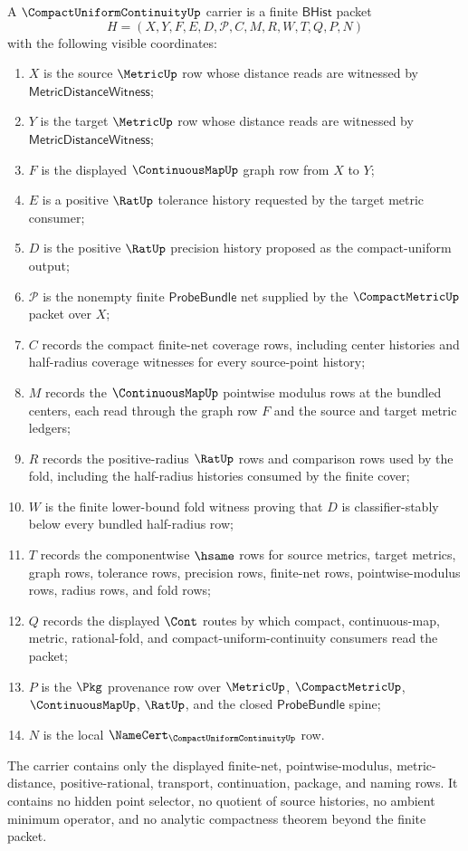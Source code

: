 \begin{definition}
\label{def:compact-uniform-continuity-carrier}
A $\CompactUniformContinuityUp$ carrier is a finite $\mathsf{BHist}$ packet
$$
H=(X,Y,F,E,D,\mathcal{P},C,M,R,W,T,Q,P,N)
$$
with the following visible coordinates:
\begin{enumerate}
\item $X$ is the source $\MetricUp$ row whose distance reads are witnessed by $\mathsf{MetricDistanceWitness}$;
\item $Y$ is the target $\MetricUp$ row whose distance reads are witnessed by $\mathsf{MetricDistanceWitness}$;
\item $F$ is the displayed $\ContinuousMapUp$ graph row from $X$ to $Y$;
\item $E$ is a positive $\RatUp$ tolerance history requested by the target metric consumer;
\item $D$ is the positive $\RatUp$ precision history proposed as the compact-uniform output;
\item $\mathcal{P}$ is the nonempty finite $\mathsf{ProbeBundle}$ net supplied by the $\CompactMetricUp$ packet over $X$;
\item $C$ records the compact finite-net coverage rows, including center histories and half-radius coverage witnesses for every source-point history;
\item $M$ records the $\ContinuousMapUp$ pointwise modulus rows at the bundled centers, each read through the graph row $F$ and the source and target metric ledgers;
\item $R$ records the positive-radius $\RatUp$ rows and comparison rows used by the fold, including the half-radius histories consumed by the finite cover;
\item $W$ is the finite lower-bound fold witness proving that $D$ is classifier-stably below every bundled half-radius row;
\item $T$ records the componentwise $\hsame$ rows for source metrics, target metrics, graph rows, tolerance rows, precision rows, finite-net rows, pointwise-modulus rows, radius rows, and fold rows;
\item $Q$ records the displayed $\Cont$ routes by which compact, continuous-map, metric, rational-fold, and compact-uniform-continuity consumers read the packet;
\item $P$ is the $\Pkg$ provenance row over $\MetricUp$, $\CompactMetricUp$, $\ContinuousMapUp$, $\RatUp$, and the closed $\mathsf{ProbeBundle}$ spine;
\item $N$ is the local $\NameCert_{\CompactUniformContinuityUp}$ row.
\end{enumerate}
The carrier contains only the displayed finite-net, pointwise-modulus, metric-distance, positive-rational, transport, continuation, package, and naming rows. It contains no hidden point selector, no quotient of source histories, no ambient minimum operator, and no analytic compactness theorem beyond the finite packet.
\end{definition}


